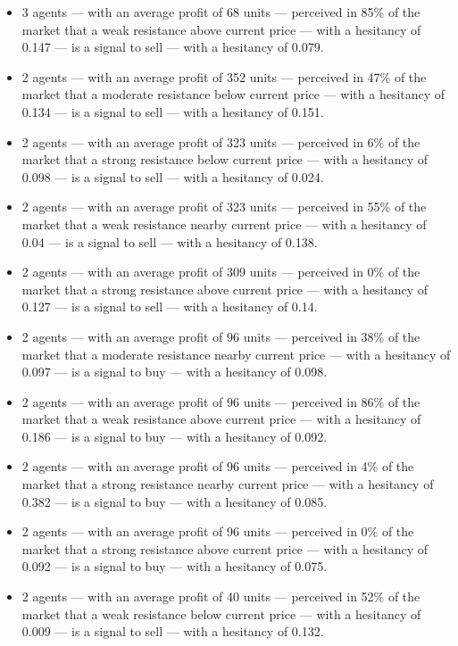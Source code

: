 \begin{itemize}
\item 3 agents — with an average profit of 68 units — perceived in 85\% of the market that a weak resistance above current price — with a hesitancy of 0.147 — is a signal to sell — with a hesitancy of 0.079.
\item 2 agents — with an average profit of 352 units — perceived in 47\% of the market that a moderate resistance below current price — with a hesitancy of 0.134 — is a signal to sell — with a hesitancy of 0.151.
\item 2 agents — with an average profit of 323 units — perceived in 6\% of the market that a strong resistance below current price — with a hesitancy of 0.098 — is a signal to sell — with a hesitancy of 0.024.
\item 2 agents — with an average profit of 323 units — perceived in 55\% of the market that a weak resistance nearby current price — with a hesitancy of 0.04 — is a signal to sell — with a hesitancy of 0.138.
\item 2 agents — with an average profit of 309 units — perceived in 0\% of the market that a strong resistance above current price — with a hesitancy of 0.127 — is a signal to sell — with a hesitancy of 0.14.
\item 2 agents — with an average profit of 96 units — perceived in 38\% of the market that a moderate resistance nearby current price — with a hesitancy of 0.097 — is a signal to buy — with a hesitancy of 0.098.
\item 2 agents — with an average profit of 96 units — perceived in 86\% of the market that a weak resistance above current price — with a hesitancy of 0.186 — is a signal to buy — with a hesitancy of 0.092.
\item 2 agents — with an average profit of 96 units — perceived in 4\% of the market that a strong resistance nearby current price — with a hesitancy of 0.382 — is a signal to buy — with a hesitancy of 0.085.
\item 2 agents — with an average profit of 96 units — perceived in 0\% of the market that a strong resistance above current price — with a hesitancy of 0.092 — is a signal to buy — with a hesitancy of 0.075.
\item 2 agents — with an average profit of 40 units — perceived in 52\% of the market that a weak resistance below current price — with a hesitancy of 0.009 — is a signal to sell — with a hesitancy of 0.132.
\end{itemize}
